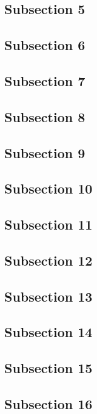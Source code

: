 \documentclass[a4paper, 11pt]{article}
\numberwithin{equation}{subsection}
\begin{document}
\subsection{Subsection 5}

\subsection{Subsection 6}

\subsection{Subsection 7}

\subsection{Subsection 8}

\subsection{Subsection 9}

\subsection{Subsection 10}

\subsection{Subsection 11}

\subsection{Subsection 12}

\subsection{Subsection 13}

\subsection{Subsection 14}

\subsection{Subsection 15}

\subsection{Subsection 16}
\end{document}
